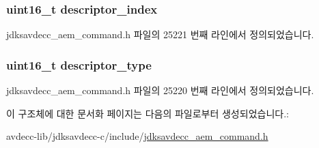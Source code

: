 \subsubsection[{\texorpdfstring{descriptor\+\_\+index}{descriptor_index}}]{\setlength{\rightskip}{0pt plus 5cm}uint16\+\_\+t descriptor\+\_\+index}\hypertarget{structjdksavdecc__aem__command__get__avb__info_a042bbc76d835b82d27c1932431ee38d4}{}\label{structjdksavdecc__aem__command__get__avb__info_a042bbc76d835b82d27c1932431ee38d4}


jdksavdecc\+\_\+aem\+\_\+command.\+h 파일의 25221 번째 라인에서 정의되었습니다.

\subsubsection[{\texorpdfstring{descriptor\+\_\+type}{descriptor_type}}]{\setlength{\rightskip}{0pt plus 5cm}uint16\+\_\+t descriptor\+\_\+type}\hypertarget{structjdksavdecc__aem__command__get__avb__info_ab7c32b6c7131c13d4ea3b7ee2f09b78d}{}\label{structjdksavdecc__aem__command__get__avb__info_ab7c32b6c7131c13d4ea3b7ee2f09b78d}


jdksavdecc\+\_\+aem\+\_\+command.\+h 파일의 25220 번째 라인에서 정의되었습니다.



이 구조체에 대한 문서화 페이지는 다음의 파일로부터 생성되었습니다.\+:\begin{DoxyCompactItemize}
\item 
avdecc-\/lib/jdksavdecc-\/c/include/\hyperlink{jdksavdecc__aem__command_8h}{jdksavdecc\+\_\+aem\+\_\+command.\+h}\end{DoxyCompactItemize}

